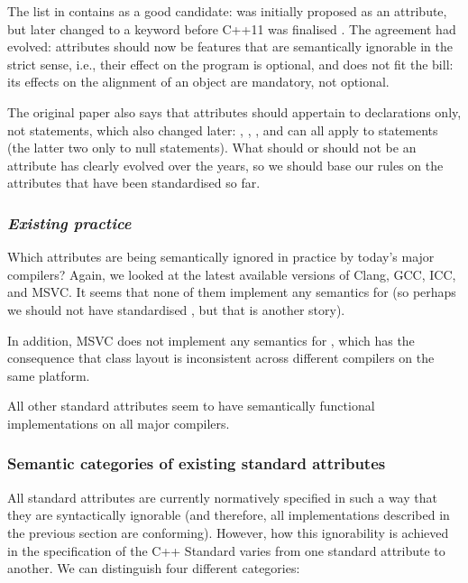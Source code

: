 The list in \cite{N2761} contains  as a good candidate:  was initially proposed as an attribute, but later changed to a keyword before C++11 was finalised \cite{N3190}. The agreement had evolved: attributes should now be features that are semantically ignorable in the strict sense, i.e., their effect on the program is optional, and  does not fit the bill: its effects on the alignment of an object are mandatory, not optional.

The original paper also says that attributes should appertain to declarations only, not statements, which also changed later: , , , and  can all apply to statements (the latter two only to null statements). What should or should not be an attribute has clearly evolved over the years, so we should base our rules on the attributes that have been standardised so far.


\subsubsection*{\emph{Existing practice}}

Which attributes are being semantically ignored in practice by today's major compilers? Again, we looked at the latest available versions of Clang, GCC, ICC, and MSVC. It seems that none of them implement any semantics for  (so perhaps we should not have standardised , but that is another story).

In addition, MSVC does not implement any semantics for , which has the consequence that class layout is inconsistent across different compilers on the same platform.

All other standard attributes seem to have semantically functional implementations on all major compilers.

\subsubsection{Semantic categories of existing standard attributes}
\label{subsubsec:attributecategories}

All standard attributes are currently normatively specified in such a way that they are syntactically ignorable (and therefore, all implementations described in the previous section are conforming). However, how this ignorability is achieved in the specification of the C++ Standard varies from one standard attribute to another. We can distinguish four different categories:

